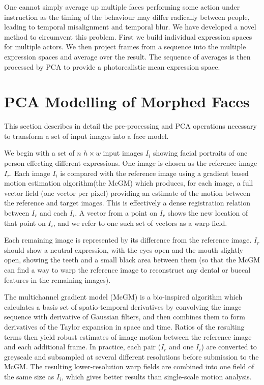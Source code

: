 \documentclass[runningheads]{llncs}
\begin{document}
One cannot simply average up multiple faces performing some action under instruction as the timing of the behaviour may differ radically between people, leading to temporal misalignment and temporal blur. We have developed a novel method to circumvent this problem. First we build individual expression spaces for multiple actors. We then project frames from a sequence into the multiple expression spaces and average over the result. The sequence of averages is then processed by PCA to provide a photorealistic mean expression space.


\section{PCA Modelling of Morphed Faces}

This section describes in detail the pre-processing and PCA operations necessary to transform a set of input images into a face model.

We begin with a set of $n$ $h\times w$ input images $I_i$ showing facial portraits of one person effecting different expressions. One image is chosen as the reference image $I_r$. Each image $I_i$ is compared with the reference image using a gradient based motion estimation algorithm(the McGM\cite{mcowan1995algorithms,anderson2003real}) which produces, for each image, a full vector field (one vector per pixel) providing an estimate of the motion between the reference and target images. This is effectively a dense registration relation between $I_r$ and each $I_i$. A vector from a point on $I_r$ shows the new location of that point on $I_i$, and we refer to one such set of vectors as a warp field.

Each remaining image is represented by its difference from the reference image. $I_r$ should show a neutral expression, with the eyes open and the mouth slightly open, showing the teeth and a small black area between them (so that the McGM can find a way to warp the reference image to reconstruct any dental or buccal features in the remaining images).

The multichannel gradient model (McGM\cite{mcowan1995algorithms,anderson2003real}) is a bio-inspired algorithm which calculates a basis set of spatio-temporal derivatives by convolving the image sequence with derivative of Gaussian filters, and then combines them to form derivatives of the Taylor expansion in space and time. Ratios of the resulting terms then yield robust estimates of image motion between the reference image and each additional frame. In practice, each pair ($I_r$ and one $I_i$) are converted to greyscale and subsampled at several different resolutions before submission to the McGM. The resulting lower-resolution warp fields are combined into one field of the same size as $I_i$, which gives better results than single-scale motion analysis. 
\end{document}
